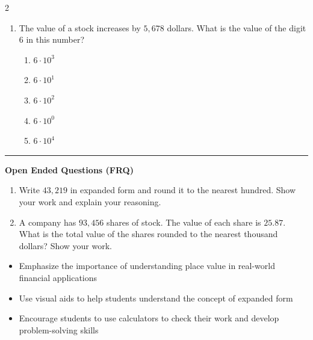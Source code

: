\documentclass[10pt]{article}
\begin{document}
\begin{multicols}{2}
\begin{enumerate}[label=\textbf{Q\arabic*.}, leftmargin=*, itemsep=6pt, parsep=0pt]
  \item \small The value of a stock increases by $5,678$ dollars. What is the value of the digit 6 in this number?
  \begin{enumerate}[label=(\Alph*), leftmargin=0.6cm, nosep, itemsep=2pt]
    \item $6\cdot10^3$
    \item $6\cdot10^1$
    \item $6\cdot10^2$
    \item $6\cdot10^0$
    \item $6\cdot10^4$
  \end{enumerate}

\end{enumerate}
\end{multicols}

\vspace{-0.2cm}
\hrule
\vspace{0.2cm}
\textbf{\small Open Ended Questions (FRQ)}
\begin{enumerate}[label=\textbf{Q\arabic*.}, start=9, itemsep=5pt, topsep=0pt]

  \item \small Write $43,219$ in expanded form and round it to the nearest hundred. Show your work and explain your reasoning. \vspace{2cm}

  \item \small A company has $93,456$ shares of stock. The value of each share is $25.87$. What is the total value of the shares rounded to the nearest thousand dollars? Show your work. \vspace{2cm}

\end{enumerate}

\vfill

\begin{tcolorbox}[colback=blue!5, colframe=mainblue!50, title=\small \textbf{Chef's Tips}, fonttitle=\bfseries, bottom=1mm]
\begin{itemize}[noitemsep, topsep=2pt, leftmargin=0.5cm]
  \item \scriptsize Emphasize the importance of understanding place value in real-world financial applications\item \scriptsize Use visual aids to help students understand the concept of expanded form\item \scriptsize Encourage students to use calculators to check their work and develop problem-solving skills
\end{itemize}
\end{tcolorbox}
\end{document}
